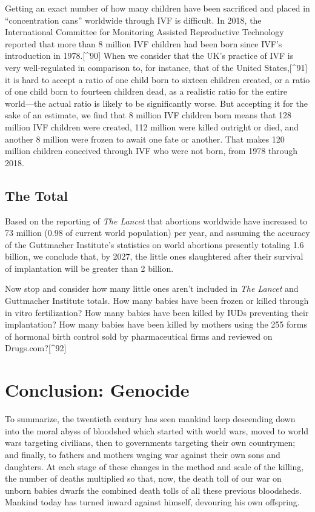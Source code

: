 \documentclass[
]{book}
\begin{document}
Getting an exact number of how many children have been sacrificed and placed in ``concentration cans'' worldwide through IVF is difficult. In 2018, the International Committee for Monitoring Assisted Reproductive Technology reported that more than 8 million IVF children had been born since IVF's introduction in 1978.{[}\^{}90{]} When we consider that the UK's practice of IVF is very well-regulated in comparison to, for instance, that of the United States,{[}\^{}91{]} it is hard to accept a ratio of one child born to sixteen children created, or a ratio of one child born to fourteen children dead, as a realistic ratio for the entire world---the actual ratio is likely to be significantly worse. But accepting it for the sake of an estimate, we find that 8 million IVF children born means that 128 million IVF children were created, 112 million were killed outright or died, and another 8 million were frozen to await one fate or another. That makes 120 million children conceived through IVF who were not born, from 1978 through 2018.

\hypertarget{the-total}{%
\subsection{The Total}\label{the-total}}

Based on the reporting of \emph{The Lancet} that abortions worldwide have increased to 73 million (0.98 of current world population) per year, and assuming the accuracy of the Guttmacher Institute's statistics on world abortions presently totaling 1.6 billion, we conclude that, by 2027, the little ones slaughtered after their survival of implantation will be greater than 2 billion.

Now stop and consider how many little ones aren't included in \emph{The Lancet} and Guttmacher Institute totals. How many babies have been frozen or killed through in vitro fertilization? How many babies have been killed by IUDs preventing their implantation? How many babies have been killed by mothers using the 255 forms of hormonal birth control sold by pharmaceutical firms and reviewed on Drugs.com?{[}\^{}92{]}

\hypertarget{conclusion-genocide}{%
\section{Conclusion: Genocide}\label{conclusion-genocide}}

To summarize, the twentieth century has seen mankind keep descending down into the moral abyss of bloodshed which started with world wars, moved to world wars targeting civilians, then to governments targeting their own countrymen; and finally, to fathers and mothers waging war against their own sons and daughters. At each stage of these changes in the method and scale of the killing, the number of deaths multiplied so that, now, the death toll of our war on unborn babies dwarfs the combined death tolls of all these previous bloodsheds. Mankind today has turned inward against himself, devouring his own offspring.
\end{document}
